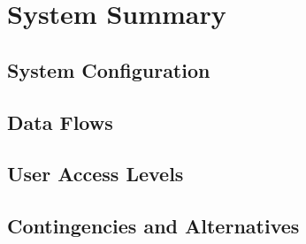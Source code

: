 \section{System Summary}

\subsection{System Configuration}

\subsection{Data Flows}

\subsection{User Access Levels}

\subsection{Contingencies and Alternatives}
